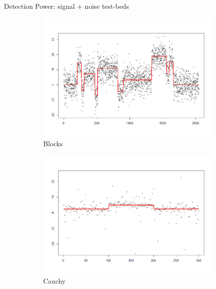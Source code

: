 \documentclass{beamer}
\begin{document}
\begin{frame}{Detection Power: signal + noise test-beds}
\begin{figure}
\centering
\begin{subfigure}[b]{0.35\textwidth}
    \centering
    \includegraphics[width=\textwidth]{../plots/blocks-testbed}
    \caption{Blocks}
\end{subfigure}
\begin{subfigure}[b]{0.35\textwidth}
    \centering
    \includegraphics[width=\textwidth]{../plots/cauchy-testbed}
    \caption{Cauchy}
\end{subfigure}
\begin{subfigure}[b]{0.35\textwidth}
    \centering

\end{subfigure}
\end{figure}
\end{frame}
\end{document}
